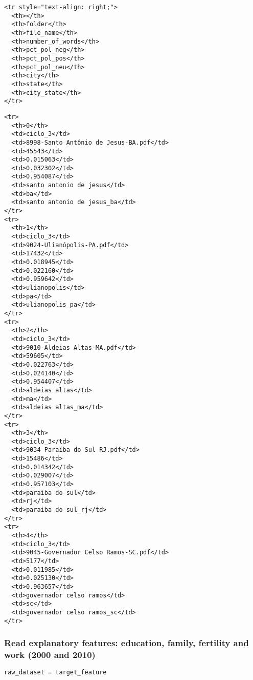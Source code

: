 \begin{lstlisting}
<tr style="text-align: right;">
  <th></th>
  <th>folder</th>
  <th>file_name</th>
  <th>number_of_words</th>
  <th>pct_pol_neg</th>
  <th>pct_pol_pos</th>
  <th>pct_pol_neu</th>
  <th>city</th>
  <th>state</th>
  <th>city_state</th>
</tr>
\end{lstlisting}

\begin{lstlisting}
<tr>
  <th>0</th>
  <td>ciclo_3</td>
  <td>8998-Santo Antônio de Jesus-BA.pdf</td>
  <td>45543</td>
  <td>0.015063</td>
  <td>0.032302</td>
  <td>0.954087</td>
  <td>santo antonio de jesus</td>
  <td>ba</td>
  <td>santo antonio de jesus_ba</td>
</tr>
<tr>
  <th>1</th>
  <td>ciclo_3</td>
  <td>9024-Ulianópolis-PA.pdf</td>
  <td>17432</td>
  <td>0.018945</td>
  <td>0.022160</td>
  <td>0.959642</td>
  <td>ulianopolis</td>
  <td>pa</td>
  <td>ulianopolis_pa</td>
</tr>
<tr>
  <th>2</th>
  <td>ciclo_3</td>
  <td>9010-Aldeias Altas-MA.pdf</td>
  <td>59605</td>
  <td>0.022763</td>
  <td>0.024140</td>
  <td>0.954407</td>
  <td>aldeias altas</td>
  <td>ma</td>
  <td>aldeias altas_ma</td>
</tr>
<tr>
  <th>3</th>
  <td>ciclo_3</td>
  <td>9034-Paraíba do Sul-RJ.pdf</td>
  <td>15486</td>
  <td>0.014342</td>
  <td>0.029007</td>
  <td>0.957103</td>
  <td>paraiba do sul</td>
  <td>rj</td>
  <td>paraiba do sul_rj</td>
</tr>
<tr>
  <th>4</th>
  <td>ciclo_3</td>
  <td>9045-Governador Celso Ramos-SC.pdf</td>
  <td>5177</td>
  <td>0.011985</td>
  <td>0.025130</td>
  <td>0.963657</td>
  <td>governador celso ramos</td>
  <td>sc</td>
  <td>governador celso ramos_sc</td>
</tr>
\end{lstlisting}

\subsubsection{Read explanatory features: education, family, fertility
and work (2000 and
2010)}\label{read-explanatory-features-education-family-fertility-and-work-2000-and-2010}

\begin{lstlisting}[language=Python]
raw_dataset = target_feature
\end{lstlisting}

